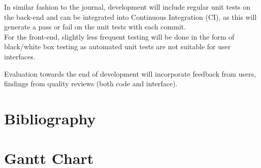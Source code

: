 \documentclass[11pt]{article}
\begin{document}
{In similar fashion to the journal, development will include regular unit tests on the back-end and can be integrated into Continuous Integration (CI), as this will generate a pass or fail on the unit tests with each commit.  \\

For the front-end, slightly less frequent testing will be done in the form of black/white box testing as automated unit tests are not suitable for user interfaces. 

Evaluation towards the end of development will incorporate feedback from users, findings from quality reviews (both code and interface). 




\newpage
\section*{Bibliography}



\vfill
\section*{Gantt Chart}

\begin{center}
\end{center}



}
\end{document}
